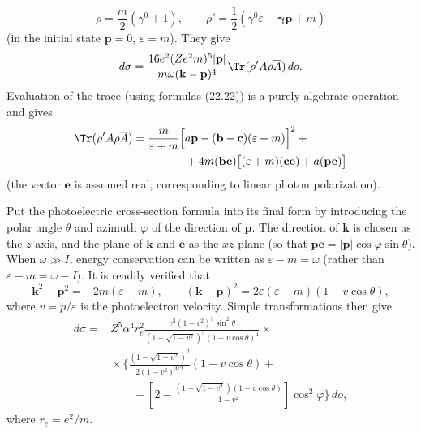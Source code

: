 \[
\rho=\frac m2(\gamma^0+1),\qquad
\rho'=\frac12(\gamma^0\varepsilon-\boldsymbol\gamma\mathbf p+m)
\]
(in the initial state $\mathbf p=0$, $\varepsilon=m$). They give
\[
d\sigma=\frac{16e^2(Ze^2m)^5|\mathbf p|}
{m\omega(\mathbf k-\mathbf p)^4}
\Tr(\rho'A\rho\overline A)\,do.
\]
Evaluation of the trace (using formulas (22.22)) is a purely algebraic operation and gives
\[
\begin{aligned}
\Tr(\rho'A\rho\overline A)
=\frac m{\varepsilon+m}\Bigl[
&a\mathbf p-(\mathbf b-\mathbf c)(\varepsilon+m)\Bigr]^2+{}\\
&+4m(\mathbf b\mathbf e)
\bigl[(\varepsilon+m)(\mathbf c\mathbf e)
+a(\mathbf p\mathbf e)\bigr]
\end{aligned}
\]
(the vector $\mathbf e$ is assumed real, corresponding to linear photon polarization).

Put the photoelectric cross-section formula into its final form by introducing the polar angle $\theta$ and azimuth $\varphi$ of the direction of $\mathbf p$. The direction of $\mathbf k$ is chosen as the $z$ axis, and the plane of $\mathbf k$ and $\mathbf e$ as the $xz$ plane (so that $\mathbf p\mathbf e=|\mathbf p|\cos\varphi\sin\theta$). When $\omega\gg I$, energy conservation can be written as $\varepsilon-m=\omega$ (rather than $\varepsilon-m=\omega-I$). It is readily verified that
\[
\mathbf k^2-\mathbf p^2=-2m(\varepsilon-m),\qquad
(\mathbf k-\mathbf p)^2=2\varepsilon(\varepsilon-m)
(1-v\cos\theta),
\]
where $v=p/\varepsilon$ is the photoelectron velocity. Simple transformations then give
\begin{equation}
\begin{aligned}
d\sigma={}&Z^5\alpha^4r_e^2
\frac{v^3(1-v^2)^3\sin^2\theta}
{(1-\sqrt{1-v^2})^5(1-v\cos\theta)^4}\mathbin{\times}\\
&{}\mathbin{\times}\Biggl\{
\frac{(1-\sqrt{1-v^2})^2}{2(1-v^2)^{3/2}}
(1-v\cos\theta)+{}\\
&\qquad+\left[
2-\frac{(1-\sqrt{1-v^2})(1-v\cos\theta)}{1-v^2}
\right]\cos^2\varphi\Biggr\}\,do,
\end{aligned}
\tag{57.8}
\end{equation}
where $r_e=e^2/m$.

